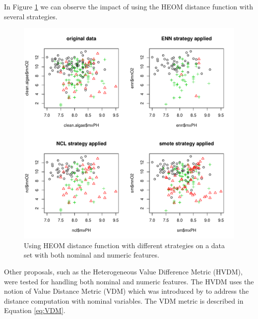 \documentclass[10pt,a4paper]{article}\usepackage[]{graphicx}\usepackage[]{color}
\makeatletter
\def\maxwidth{ %
  \ifdim\Gin@nat@width>\linewidth
    \linewidth
  \else
    \Gin@nat@width
  \fi
}
\newenvironment{knitrout}{}{} %
\makeatother
\begin{document}
In Figure \ref{fig:dist_heom} we can observe the impact of using the HEOM distance function with several strategies.
\begin{knitrout}\footnotesize
{}\color{fgcolor}\begin{figure}

{\centering \includegraphics[width=\maxwidth]{figures/UBL-dist_heom-1} 

}

\caption[Using HEOM distance function with different strategies on a data set with both nominal and numeric features]{Using HEOM distance function with different strategies on a data set with both nominal and numeric features.}\label{fig:dist_heom}
\end{figure}


\end{knitrout}


Other proposals, such as the Heterogeneous Value Difference Metric (HVDM), were tested for handling both nominal and numeric features. The HVDM uses the notion of Value Distance Metric (VDM) which was introduced by \cite{stanfill1986toward} to address the distance computation with nominal variables. The VDM metric is described in Equation \ref{eq:VDM}.
\end{document}
